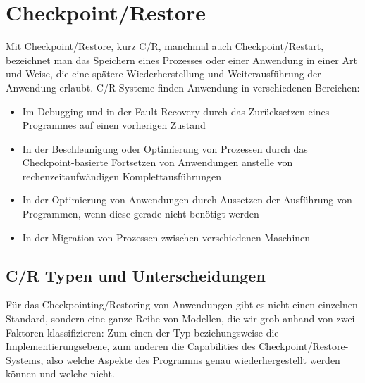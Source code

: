 \documentclass[a4paper]{article}
\begin{document}
\section{Checkpoint/Restore}
Mit Checkpoint/Restore, kurz C/R, manchmal auch Checkpoint/Restart, bezeichnet man das Speichern eines Prozesses oder einer Anwendung in einer Art und Weise, die eine spätere Wiederherstellung und Weiterausführung der Anwendung erlaubt.
C/R-Systeme finden Anwendung in verschiedenen Bereichen:
\begin{itemize}
    \item Im Debugging und in der Fault Recovery durch das Zurücksetzen eines Programmes auf einen vorherigen Zustand
    \item In der Beschleunigung oder Optimierung von Prozessen durch das Check\-point-basierte Fortsetzen von Anwendungen anstelle von rechenzeitauf\-wändigen Komplettausführungen
    \item In der Optimierung von Anwendungen durch Aussetzen der Ausführung von Programmen, wenn diese gerade nicht benötigt werden
    \item In der Migration von Prozessen zwischen verschiedenen Maschinen
\end{itemize}

\subsection{C/R Typen und Unterscheidungen}
Für das Checkpointing/Restoring von Anwendungen gibt es nicht einen einzelnen Standard, sondern eine ganze Reihe von Modellen, die wir grob anhand von zwei Faktoren klassifizieren: Zum einen der Typ beziehungsweise die Implementierungsebene, zum anderen die Capabilities des Checkpoint/Restore-Systems, also welche Aspekte des Programms genau wiederhergestellt werden können und welche nicht.
\end{document}
